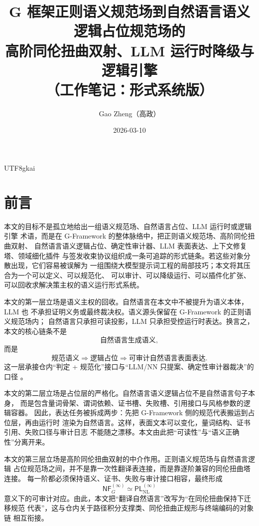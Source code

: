 \documentclass[12pt]{article}
\newcommand{\GFramework}{\textsf{G-Framework}}
\begin{document}
\begin{CJK*}{UTF8}{gkai}

\title{G 框架正则语义规范场到自然语言语义逻辑占位规范场的\\高阶同伦扭曲双射、LLM 运行时降级与逻辑引擎\\（工作笔记：形式系统版）}
\author{Gao Zheng（高政）}
\date{2026-03-10}
\maketitle

\section*{前言}

本文的目标不是孤立地给出一组语义规范场、自然语言占位、LLM 运行时或逻辑引擎
术语，而是在 \GFramework{} 的整体脉络中，把正则语义规范场、高阶同伦扭曲双射、
自然语言语义逻辑占位、确定性审计器、LLM 表面表达、上下文修复塔、领域细化插件
与签发收束协议组织成一条可追踪的形式链条。若这些对象分散出现，它们容易被误解为
一组围绕大模型提示词工程的局部技巧；本文将其压合为一个可以定义、可以规范化、
可以审计、可以降级运行、可以插件化扩张、可以回收求解决策主权的语义运行形式系统。

本文的第一层立场是语义主权的回收。自然语言在本文中不被提升为语义本体，LLM 也
不承担证明义务或最终裁决权。语义源头保留在 \GFramework{} 的正则语义规范场内；
自然语言只承担可读投影，LLM 只承担受控运行时表达。换言之，本文的核心链条不是
\[
  \text{自然语言生成语义},
\]
而是
\[
  \text{规范语义}
  \Longrightarrow
  \text{逻辑占位}
  \Longrightarrow
  \text{可审计自然语言表面表达}.
\]
这一层承接仓内“判定 + 规范化”接口与“LLM/NN 只提案、确定性审计器裁决”的口径
\cite{RepoTex20SemanticGaugeNormalization,RepoTex21AuditedWrapper,RepoTex23SemanticBase}。

本文的第二层立场是占位层的严格化。自然语言语义逻辑占位不是自然语言句子本身，
而是包含量词骨架、谓词依赖、证书槽、失败槽、引用接口与风格参数的逻辑容器。
因此，表达任务被拆成两步：先把 \GFramework{} 侧的规范代表搬运到占位层，再由运行时
渲染为自然语言。这样，表面文本可以变化，量词结构、证书引用、失败口径与审计日志
不能随之漂移。本文由此把“可读性”与“语义正确性”分离开来。

本文的第三层立场是高阶同伦扭曲双射的中介作用。正则语义规范场与自然语言逻辑
占位规范场之间，并不是靠一次性翻译表连接，而是靠逐阶兼容的同伦扭曲塔连接。
每一阶都必须保持语义、证书、失败与审计接口相容，最终形成
\[
  \mathsf{NF}^{(\infty)}_G
  \simeq
  \mathsf{PL}^{(\infty)}_{\mathrm{NL}}
\]
意义下的可审计对应。由此，本文把“翻译自然语言”改写为“在同伦扭曲保持下迁移规范
代表”，这与仓内关于路径积分支撑类、同伦扭曲正规形与终端编码的对象链
\cite{RepoTex36HomotopyTwistBijection} 相互衔接。


\end{CJK*}
\end{document}
